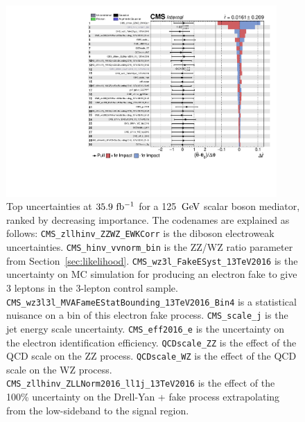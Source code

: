 \begin{figure}[hbtp]
 \begin{center}
   \includegraphics[width=0.92\textwidth,page=1]{figures/impacts_zmet_da.pdf}
 \end{center}
 \caption{Top uncertainties at $35.9~\mathrm{fb^{-1}}$ for a 125 $\,\text{Ge\hspace{-.08em}V}$ scalar boson mediator, ranked by decreasing importance. The codenames are explained as follows:
\texttt{CMS\_zllhinv\_ZZWZ\_EWKCorr} is the diboson electroweak uncertainties.
\texttt{CMS\_hinv\_vvnorm\_bin} is the ZZ/WZ ratio parameter from Section~\ref{sec:likelihood}. 
\texttt{CMS\_wz3l\_FakeESyst\_13TeV2016} is the uncertainty on MC simulation for producing an electron fake to give 3 leptons in the 3-lepton control sample.
\texttt{CMS\_wz3l3l\_MVAFameEStatBounding\_13TeV2016\_Bin4} is a statistical nuisance on a bin of this electron fake process.
\texttt{CMS\_scale\_j} is the jet energy scale uncertainty.
\texttt{CMS\_eff2016\_e} is the uncertainty on the electron identification efficiency.
\texttt{QCDscale\_ZZ} is the effect of the QCD scale on the ZZ process.
\texttt{QCDscale\_WZ} is the effect of the QCD scale on the WZ process.
\texttt{CMS\_zllhinv\_ZLLNorm2016\_ll1j\_13TeV2016} is the effect of the 100\% uncertainty on the Drell-Yan + fake \met process extrapolating from the low-\met sideband to the signal region.
 }
\label{fig:impacts}
\end{figure}

\clearpage

